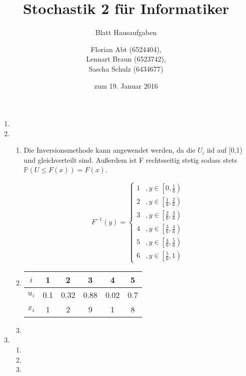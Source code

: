 \documentclass[a4paper]{scrartcl}
\title{Stochastik 2 für Informatiker}
\subtitle{Blatt {\blattnr} Hausaufgaben}
\author{
    Florian Abt (6524404), \\
    Lennart Braun (6523742), \\
    Sascha Schulz (6434677)
}
\date{zum 19. Januar 2016}
\def \blattnr {12}
\begin{document}
\maketitle

\begin{enumerate}[label=\bfseries \blattnr.\arabic*]
    \item %

    \item %
        \begin{enumerate}
            \item
              Die Inversionsmethode kann angewendet werden, da die $U_i$ iid auf 
              [0,1) und gleichverteilt sind. Außerdem ist F rechtsseitig stetig 
              sodass stets \\ 
              $\mathbb{P}(U\leq F(x))=F(x)$.
              
	      \begin{equation*}
		F^{-1}(y) = \begin{cases}
			      1 &, y \in \left[0,\frac16 \right) \\
			      2 &, y \in \left[\frac16, \frac26 \right)\\
			      3 &, y \in \left[\frac26,\frac36 \right)\\
			      4 &, y \in \left[\frac36,\frac46 \right)\\
			      5 &, y \in \left[\frac46,\frac56 \right)\\
			      6 &, y \in \left[\frac56,1 \right)
		            \end{cases}
	      \end{equation*}
	      
            \item
	      \begin{tabular}{c|c|c|c|c|c}
	       $i$ & 1 & 2 & 3 & 4 & 5 \\
	       \hline
	       $u_i$ & 0.1 & 0.32 & 0.88 & 0.02 & 0.7 \\
	       \hline
	       $x_i$ & 1 & 2 & 9 & 1 & 8
	      \end{tabular}

            \item

        \end{enumerate}

    \item %
        \begin{enumerate}
            \item

            \item

            \item

        \end{enumerate}

\end{enumerate}
\end{document}
